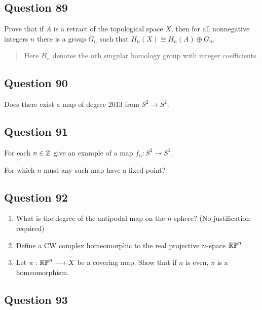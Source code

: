\documentclass[12pt]{article}
\begin{document}
\hypertarget{question-89-2}{%
\subsection{Question 89}\label{question-89-2}}

Prove that if \(A\) is a retract of the topological space \(X\), then
for all nonnegative integers \(n\) there is a group \(G_n\) such that
\(H_{n} (X) \cong H_{n} (A) \oplus G_n\).

\begin{quote}
Here \(H_{n}\) denotes the \(n\)th singular homology group with integer
coefficients.
\end{quote}

\hypertarget{question-90-2}{%
\subsection{Question 90}\label{question-90-2}}

Does there exist a map of degree 2013 from \(S^2 \to S^2\).

\hypertarget{question-91-2}{%
\subsection{Question 91}\label{question-91-2}}

For each \(n \in {\mathbb{Z}}\) give an example of a map \(f_n : S^2 \to S^2\).

For which \(n\) must any such map have a fixed point?

\hypertarget{question-92-2}{%
\subsection{Question 92}\label{question-92-2}}

\begin{enumerate}
\def\labelenumi{\alph{enumi}.}
\item
  What is the degree of the antipodal map on the \(n\)-sphere? (No
  justification required)
\item
  Define a CW complex homeomorphic to the real projective
  \(n{\hbox{-}}\)space \({\mathbb{RP}}^n\).
\item
  Let \(\pi : {\mathbb{RP}}^n \longrightarrow X\) be a covering map. Show that if \(n\) is
  even, \(\pi\) is a homeomorphism.
\end{enumerate}

\hypertarget{question-93-2}{%
\subsection{Question 93}\label{question-93-2}}
\end{document}

